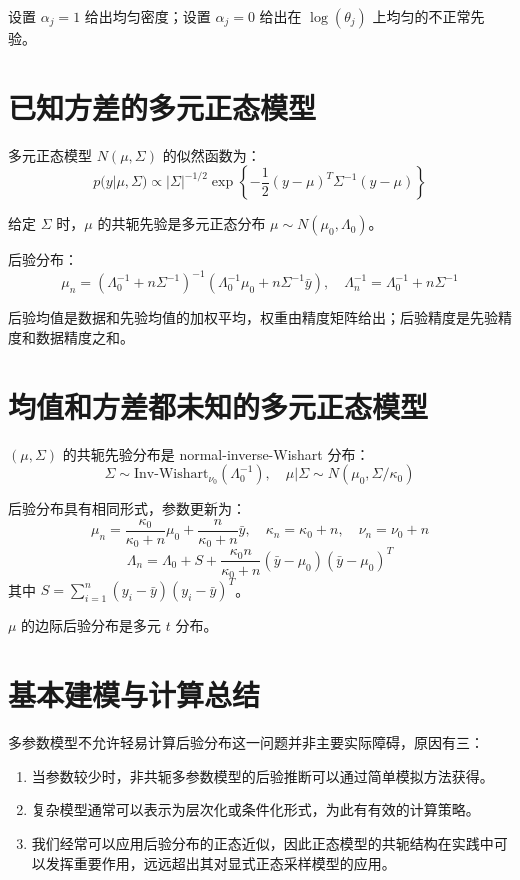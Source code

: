 设置 $\alpha_j = 1$ 给出均匀密度；设置 $\alpha_j = 0$ 给出在 $\log(\theta_j)$ 上均匀的不正常先验。

\section{已知方差的多元正态模型}

多元正态模型 $N(\mu, \Sigma)$ 的似然函数为：
\[
p(y|\mu, \Sigma) \propto |\Sigma|^{-1/2} \exp\left\{-\frac{1}{2}(y-\mu)^T\Sigma^{-1}(y-\mu)\right\}
\]

给定 $\Sigma$ 时，$\mu$ 的共轭先验是多元正态分布 $\mu \sim N(\mu_0, \Lambda_0)$。

后验分布：
\[
\mu_n = (\Lambda_0^{-1} + n\Sigma^{-1})^{-1}(\Lambda_0^{-1}\mu_0 + n\Sigma^{-1}\bar{y}), \quad
\Lambda_n^{-1} = \Lambda_0^{-1} + n\Sigma^{-1}
\]

后验均值是数据和先验均值的加权平均，权重由精度矩阵给出；后验精度是先验精度和数据精度之和。

\section{均值和方差都未知的多元正态模型}

$(\mu, \Sigma)$ 的共轭先验分布是 normal-inverse-Wishart 分布：
\[
\Sigma \sim \text{Inv-Wishart}_{\nu_0}(\Lambda_0^{-1}), \quad \mu | \Sigma \sim N(\mu_0, \Sigma/\kappa_0)
\]

后验分布具有相同形式，参数更新为：
\[
\mu_n = \frac{\kappa_0}{\kappa_0+n}\mu_0 + \frac{n}{\kappa_0+n}\bar{y}, \quad
\kappa_n = \kappa_0 + n, \quad
\nu_n = \nu_0 + n
\]
\[
\Lambda_n = \Lambda_0 + S + \frac{\kappa_0 n}{\kappa_0+n}(\bar{y}-\mu_0)(\bar{y}-\mu_0)^T
\]
其中 $S = \sum_{i=1}^n (y_i - \bar{y})(y_i - \bar{y})^T$。

$\mu$ 的边际后验分布是多元 $t$ 分布。

\section{基本建模与计算总结}

多参数模型不允许轻易计算后验分布这一问题并非主要实际障碍，原因有三：

\begin{enumerate}
  \item 当参数较少时，非共轭多参数模型的后验推断可以通过简单模拟方法获得。
  \item 复杂模型通常可以表示为层次化或条件化形式，为此有有效的计算策略。
  \item 我们经常可以应用后验分布的正态近似，因此正态模型的共轭结构在实践中可以发挥重要作用，远远超出其对显式正态采样模型的应用。
\end{enumerate}

